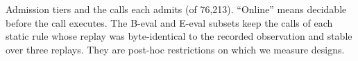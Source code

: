 \begin{table}[htbp]
  \caption{Admission tiers and the calls each admits (of 76,213). ``Online'' means decidable before the call executes.
  The B-eval and E-eval subsets keep the calls of each static rule whose replay was byte-identical to the recorded
  observation and stable over three replays. They are post-hoc restrictions on which we measure designs.}
  \label{tab:tiers}
  \small\setlength{\tabcolsep}{3pt}
  
\end{table}
